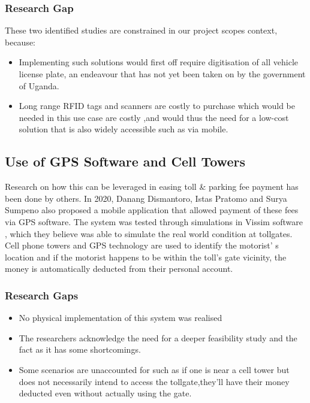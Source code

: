 \subsubsection{Research Gap}
These two identified studies are constrained in our project scope\’s context, because:
\begin{itemize}
    \item Implementing such solutions would first off require digitisation of all vehicle license plate, an endeavour that has not yet been taken on by the government of Uganda.
    \item Long range RFID tags and scanners are costly to purchase which would be needed in this use case are costly ,and would thus the need for a low-cost solution that is also widely accessible such as via mobile.
\end{itemize}



\clearpage

\subsection{Use of GPS Software and Cell Towers}
Research on how this can be leveraged in easing toll & parking fee payment has been done by others. In 2020, Danang Dismantoro, Istas Pratomo and Surya Sumpeno also proposed a mobile application that allowed payment of these fees via GPS software\cite{el-rabbany_introduction_2002,dismantoro_minimizing_2020}. The system was tested through simulations in Vissim software \cite{ptv_vissim_traffic_2022}, which they believe was able to simulate the real world condition at tollgates. Cell phone towers and GPS technology are used to identify the motorist’ s location and if the motorist happens to be within the toll’s gate vicinity, the money is automatically deducted from their personal account.

\subsubsection{Research Gaps}
\begin{itemize}
    \item No physical implementation of this system was realised
    \item The researchers acknowledge the need for a deeper feasibility study and the fact as it has some shortcomings.
    \item Some scenarios are unaccounted for such as if one is near a cell tower but does not necessarily intend to access the tollgate,they’ll have their money deducted even without actually using the gate.
\end{itemize}


